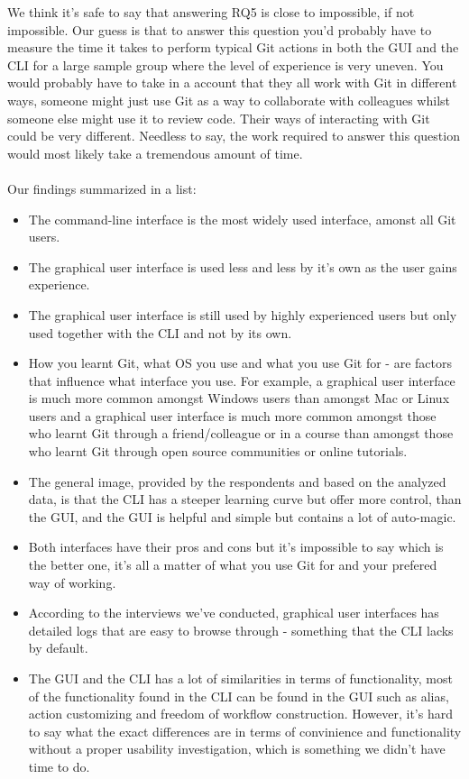 \documentclass[a4paper,oneside]{bth} %
\begin{document}
				We think it's safe to say that answering RQ5 is close to impossible, if not impossible.
				Our guess is that to answer this question you'd probably have to measure the time it takes to perform typical Git actions in both the GUI and the CLI for a large sample group where the level of experience is very uneven. You would probably have to take in a account that they all work with Git in different ways, someone might just use Git as a way to collaborate with colleagues whilst someone else might use it to review code. Their ways of interacting with Git could be very different. Needless to say, the work required to answer this question would most likely take a tremendous amount of time.
				\\\\
				Our findings summarized in a list:
				\begin{itemize}
					\item The command-line interface is the most widely used interface, amonst all Git users.
					\item The graphical user interface is used less and less by it's own as the user gains experience.
					\item The graphical user interface is still used by highly experienced users but only used together with the CLI and not by its own.
					\item How you learnt Git, what OS you use and what you use Git for - are factors that influence what interface you use. For example, a graphical user interface is much more common amongst Windows users than amongst Mac or Linux users and a graphical user interface is much more common amongst those who learnt Git through a friend/colleague or in a course than amongst those who learnt Git through open source communities or online tutorials.
					\item The general image, provided by the respondents and based on the analyzed data, is that the CLI has a steeper learning curve but offer more control, than the GUI, and the GUI is helpful and simple but contains a lot of auto-magic.
					\item Both interfaces have their pros and cons but it's impossible to say which is the better one, it's all a matter of what you use Git for and your prefered way of working.
					\item According to the interviews we've conducted, graphical user interfaces has detailed logs that are easy to browse through - something that the CLI lacks by default.
					\item The GUI and the CLI has a lot of similarities in terms of functionality, most of the functionality found in the CLI can be found in the GUI such as alias, action customizing and freedom of workflow construction. However, it's hard to say what the exact differences are in terms of convinience and functionality without a proper usability investigation, which is something we didn't have time to do.				 
				\end{itemize}
				
\end{document}
